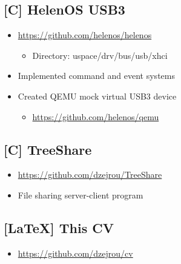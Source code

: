 \documentclass[8pt]{article}
\newcommand\csharp{C\scalerel*{\#}{X}}
\begin{document}
\begin{minipage}[t]{0.45\textwidth}
\centering

\subsection*{[C] HelenOS USB3}
\begin{itemize}
    \item \url{https://github.com/helenos/helenos}
    \begin{itemize}
        \item Directory: uspace/drv/bus/usb/xhci
    \end{itemize}
    \item Implemented command and event systems
    \item Created QEMU mock virtual USB3 device
    \begin{itemize}
        \item \url{https://github.com/helenos/qemu}
    \end{itemize}
\end{itemize}

\subsection*{[\csharp] TreeShare}
\begin{itemize}
    \item \url{https://github.com/dzejrou/TreeShare}
    \item File sharing server-client program
\end{itemize}

\subsection*{[\LaTeX] This CV}
\begin{itemize}
    \item \url{https://github.com/dzejrou/cv}
\end{itemize}

\end{minipage}
\end{document}
